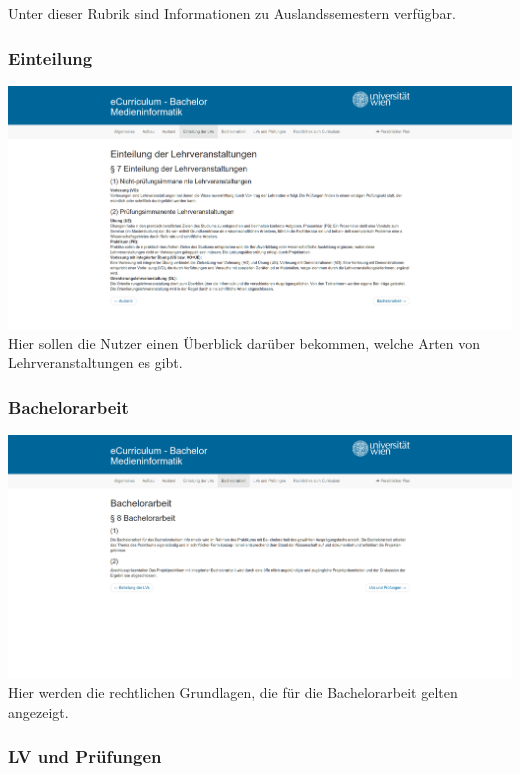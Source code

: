 \documentclass[a4paper,10pt]{scrartcl}
\begin{document}
Unter dieser Rubrik sind Informationen zu Auslandssemestern verfügbar.

\subsubsection{Einteilung}

\includegraphics[scale=0.19]{./hifi_screenshots/hifi_einteilung.png}\\

Hier sollen die Nutzer einen Überblick darüber bekommen, welche Arten von Lehrveranstaltungen es gibt.

\subsubsection{Bachelorarbeit}

\includegraphics[scale=0.19]{./hifi_screenshots/hifi_bachelor.png}\\

Hier werden die rechtlichen Grundlagen, die für die Bachelorarbeit gelten angezeigt.

\subsubsection{LV und Prüfungen}
\end{document}
